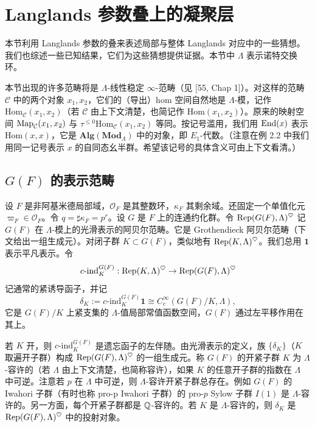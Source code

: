 \section{Langlands 参数叠上的凝聚层}

本节利用 Langlands 参数的叠来表述局部与整体 Langlands 对应中的一些猜想。我们也综述一些已知结果，它们为这些猜想提供证据。本节中 $\Lambda$ 表示诺特交换环。

本节出现的许多范畴将是 $\Lambda$-线性稳定 $\infty$-范畴（见 [55, Chap 1]）。对这样的范畴 $\mathcal C$ 中的两个对象 $x_1,x_2$，它们的（导出）hom 空间自然地是 $\Lambda$-模，记作 $\mathrm{Hom}_{\mathcal C}(x_1,x_2)$（若 $\mathcal C$ 由上下文清楚，也简记作 $\mathrm{Hom}(x_1,x_2)$）。原来的映射空间 $\operatorname{Map}_{\mathcal C}(x_1,x_2)$ 与 $\tau^{\le 0}\mathrm{Hom}_{\mathcal C}(x_1,x_2)$ 等同。按记号滥用，我们用 $\operatorname{End}(x)$ 表示 $\mathrm{Hom}(x,x)$，它是 $\mathbf{Alg}(\mathbf{Mod}_{\Lambda})$ 中的对象，即 $E_1$-代数。（注意在例 2.2 中我们用同一记号表示 $x$ 的自同态幺半群。希望该记号的具体含义可由上下文看清。）

\subsection{$G(F)$ 的表示范畴}

设 $F$ 是非阿基米德局部域，$\mathcal O_F$ 是其整数环，$\kappa_F$ 其剩余域。还固定一个单值化元 $\varpi_F\in\mathcal O_F$。令 $q=\sharp\kappa_F=p^{r}$。设 $G$ 是 $F$ 上的连通约化群。令 $\operatorname{Rep}(G(F),\Lambda)^{\heartsuit}$ 记 $G(F)$ 在 $\Lambda$-模上的光滑表示的阿贝尔范畴。它是 Grothendieck 阿贝尔范畴（下文给出一组生成元）。对闭子群 $K\subset G(F)$，类似地有 $\operatorname{Rep}(K,\Lambda)^{\heartsuit}$。我们总用 $\mathbf 1$ 表示平凡表示。令
\[
c\text{-ind}^{G(F)}_{K}:\operatorname{Rep}(K,\Lambda)^{\heartsuit}\to\operatorname{Rep}(G(F),\Lambda)^{\heartsuit}
\]
记通常的紧诱导函子，并记
\[
\delta_K:=c\text{-ind}^{G(F)}_{K}\mathbf 1\cong C^{\infty}_c(G(F)/K,\Lambda),
\]
它是 $G(F)/K$ 上紧支集的 $\Lambda$-值局部常值函数空间，$G(F)$ 通过左平移作用在其上。

若 $K$ 开，则 $c\text{-ind}^{G(F)}_{K}$ 是遗忘函子的左伴随。由光滑表示的定义，族 $\{\delta_K\}$（$K$ 取遍开子群）构成 $\operatorname{Rep}(G(F),\Lambda)^{\heartsuit}$ 的一组生成元。称 $G(F)$ 的开紧子群 $K$ 为 $\Lambda$-容许的（若 $\Lambda$ 由上下文清楚，也简称容许），如果 $K$ 的任意开子群的指数在 $\Lambda$ 中可逆。注意若 $p$ 在 $\Lambda$ 中可逆，则 $\Lambda$-容许开紧子群总存在。例如 $G(F)$ 的 Iwahori 子群（有时也称 pro-p Iwahori 子群）的 pro-$p$ Sylow 子群 $I(1)$ 是 $\Lambda$-容许的。另一方面，每个开紧子群都是 $\mathbb{Q}$-容许的。若 $K$ 是 $\Lambda$-容许的，则 $\delta_K$ 是 $\operatorname{Rep}(G(F),\Lambda)^{\heartsuit}$ 中的投射对象。

